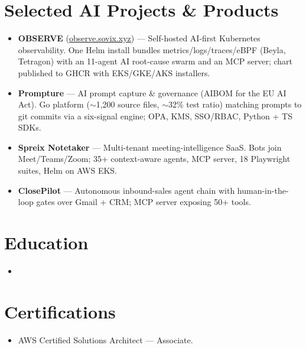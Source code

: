 \documentclass[11pt,a4paper,sans]{moderncv}
\begin{document}

\section{Selected AI Projects \& Products}
\vspace{1pt}
\begin{itemize}
\item \textbf{OBSERVE} (\href{https://observe.sovix.xyz}{observe.sovix.xyz}) --- Self-hosted AI-first Kubernetes observability. One Helm install bundles metrics/logs/traces/eBPF (Beyla, Tetragon) with an 11-agent AI root-cause swarm and an MCP server; chart published to GHCR with EKS/GKE/AKS installers.
\item \textbf{Prompture} --- AI prompt capture \& governance (AIBOM for the EU AI Act). Go platform ($\sim$1,200 source files, $\sim$32\% test ratio) matching prompts to git commits via a six-signal engine; OPA, KMS, SSO/RBAC, Python + TS SDKs.
\item \textbf{Spreix Notetaker} --- Multi-tenant meeting-intelligence SaaS. Bots join Meet/Teams/Zoom; 35+ context-aware agents, MCP server, 18 Playwright suites, Helm on AWS EKS.
\item \textbf{ClosePilot} --- Autonomous inbound-sales agent chain with human-in-the-loop gates over Gmail + CRM; MCP server exposing 50+ tools.
\end{itemize}


\section{Education}
\vspace{1pt}
\begin{itemize}
\item{}
\end{itemize}


\section{Certifications}
\vspace{1pt}
\begin{itemize}
\item AWS Certified Solutions Architect --- Associate.
\end{itemize}
\end{document}
